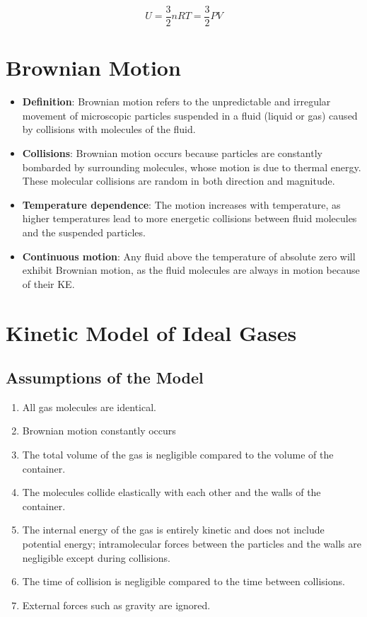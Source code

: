 \documentclass[a4paper,12pt]{article}
\let\oldsection\section
\renewcommand\section{\clearpage\oldsection}
\begin{document}
$$U = \frac{3}{2}nRT = \frac{3}{2}PV$$

\section{Brownian Motion}

\begin{itemize}
  \item \textbf{Definition}: Brownian motion refers to the unpredictable and irregular movement of microscopic particles suspended in a fluid (liquid or gas) caused by collisions with molecules of the fluid.
  \item \textbf{Collisions}: Brownian motion occurs because particles are constantly bombarded by surrounding molecules, whose motion is due to thermal energy. These molecular collisions are random in both direction and magnitude.
  \item \textbf{Temperature dependence}: The motion increases with temperature, as higher temperatures lead to more energetic collisions between fluid molecules and the suspended particles.
  \item \textbf{Continuous motion}: Any fluid above the temperature of absolute zero will exhibit Brownian motion, as the fluid molecules are always in motion because of their KE.
\end{itemize}

\section{Kinetic Model of Ideal Gases}

\subsection{Assumptions of the Model}

\begin{enumerate}
  \item All gas molecules are identical.
  \item Brownian motion constantly occurs
  \item The total volume of the gas is negligible compared to the volume of the container.
  \item The molecules collide elastically with each other and the walls of the container.
  \item The internal energy of the gas is entirely kinetic and does not include potential energy; intramolecular forces between the particles and the walls are negligible except during collisions.
  \item The time of collision is negligible compared to the time between collisions.
  \item External forces such as gravity are ignored.
\end{enumerate}
\end{document}
